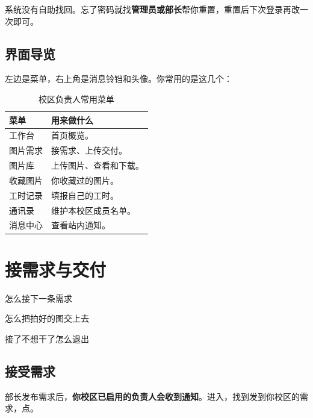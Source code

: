 \documentclass[cn,11pt,green]{elegantbook}
\begin{document}
\begin{tipbox}[忘记密码]
  系统没有自助找回。忘了密码就找\textbf{管理员或部长}帮你重置，重置后下次登录再改一次即可。
\end{tipbox}

\section{界面导览}

左边是菜单，右上角是消息铃铛和头像。你常用的是这几个：

\begin{table}[htbp]
  \centering
  \caption{校区负责人常用菜单}
  \begin{tabular}{L{2.8cm} L{9.4cm}}
    \toprule
    \textbf{菜单} & \textbf{用来做什么} \\
    \midrule
    工作台 & 首页概览。 \\
    图片需求 & 接需求、上传交付。 \\
    图片库 & 上传图片、查看和下载。 \\
    收藏图片 & 你收藏过的图片。 \\
    工时记录 & 填报自己的工时。 \\
    通讯录 & 维护本校区成员名单。 \\
    消息中心 & 查看站内通知。 \\
    \bottomrule
  \end{tabular}
\end{table}

\chapter{接需求与交付}

\begin{introduction}
  \item 怎么接下一条需求
  \item 怎么把拍好的图交上去
  \item 接了不想干了怎么退出
\end{introduction}

\section{接受需求}

部长发布需求后，\textbf{你校区已启用的负责人会收到通知}。进入，找到发到你校区的需求，点。
\end{document}
